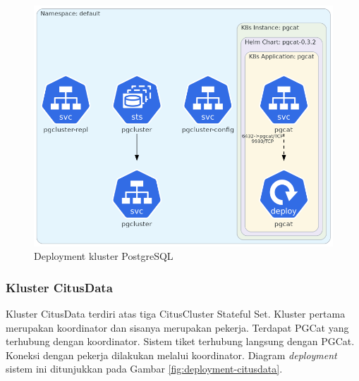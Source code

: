 \begin{figure}[htbp]
    \centering
    \includegraphics[width=1\textwidth]{resources/chapter-4/postgres.png}
    \caption{Deployment kluster PostgreSQL}
    \label{fig:deployment-postgres}
\end{figure}


\pagebreak

\subsubsection{Kluster CitusData}

Kluster CitusData terdiri atas tiga CitusCluster Stateful Set. Kluster pertama merupakan koordinator dan sisanya merupakan pekerja. Terdapat PGCat yang terhubung dengan koordinator. Sistem tiket terhubung langsung dengan PGCat. Koneksi dengan pekerja dilakukan melalui koordinator. Diagram \textit{deployment} sistem ini ditunjukkan pada Gambar \ref{fig:deployment-citusdata}.

